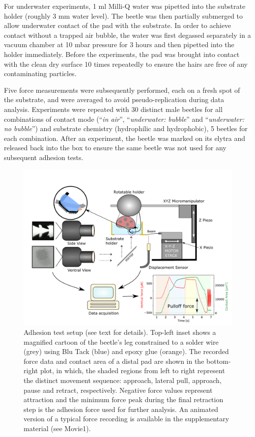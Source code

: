 \documentclass[vruler,JEB]{COB}%
\begin{document}
For underwater experiments, 1 ml Milli-Q water was pipetted into the
substrate holder (roughly 3 mm water level). The beetle was then partially 
submerged to allow underwater contact of the pad with the substrate. In order to achieve contact without
a trapped air bubble, the water was first degassed separately in a vacuum chamber
at 10 mbar pressure for 3 hours and then pipetted into the holder immediately. Before the experiments,
the pad was brought into contact with the clean dry surface 10 times repeatedly 
to ensure the hairs are free of any contaminating particles. 

Five force measurements were subsequently performed, each on a fresh spot of the substrate, and were averaged to avoid pseudo-replication during data analysis. Experiments were repeated with 30 distinct male beetles for all combinations of contact mode (``\emph{in air}'', ``\emph{underwater:
bubble}'' and ``\emph{underwater: no bubble}'') and substrate chemistry (hydrophilic and hydrophobic), 5 beetles for each  combination. After an experiment, the beetle was marked on its elytra and released back into the box to ensure the same beetle was not used for any subsequent adhesion tests.


\begin{figure}[!t]
\centering
\includegraphics[width=6in]{Figure1-Setup_schematic}%
\caption[]{Adhesion test setup (see text for details). Top-left inset shows a magnified cartoon of the beetle's leg constrained to a solder wire (grey) using Blu Tack (blue) and epoxy glue (orange). The recorded force data and
contact area of a distal pad are shown in the bottom-right plot, in which, the shaded
regions from left to right represent the distinct movement sequence: approach, lateral pull, approach, pause and retract, respectively. Negative force values
represent attraction and the minimum force peak during the final retraction
step is the adhesion force used for further analysis. An animated version of a typical force recording is available in the supplementary material (see Movie1).}
\label{fig:Setup}
\end{figure}
\end{document}
